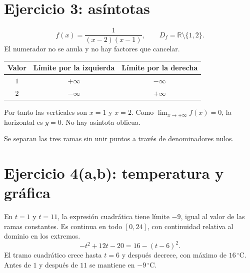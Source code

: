 \documentclass[11pt]{article}
\begin{document}
\section*{Ejercicio 3: asíntotas}
\[f(x)=\frac1{(x-2)(x-1)},\qquad D_f=\mathbb R\setminus\{1,2\}.\]
El numerador no se anula y no hay factores que cancelar.
\begin{center}\begin{tabular}{c|cc}
Valor & Límite por la izquierda & Límite por la derecha\\\hline
$1$ & $+\infty$ & $-\infty$\\
$2$ & $-\infty$ & $+\infty$
\end{tabular}\end{center}
Por tanto las verticales son $x=1$ y $x=2$. Como $\lim_{x\to\pm\infty}f(x)=0$, la horizontal es $y=0$. No hay asíntota oblicua.
\begin{center}\end{center}
Se separan las tres ramas sin unir puntos a través de denominadores nulos.
\clearpage
\section*{Ejercicio 4(a,b): temperatura y gráfica}
En $t=1$ y $t=11$, la expresión cuadrática tiene límite $-9$, igual al valor de las ramas constantes. Es continua en todo $[0,24]$, con continuidad relativa al dominio en los extremos.
\[-t^2+12t-20=16-(t-6)^2.\]
El tramo cuadrático crece hasta $t=6$ y después decrece, con máximo de $16\,^{\circ}\mathrm C$. Antes de $1$ y después de $11$ se mantiene en $-9\,^{\circ}\mathrm C$.
\begin{center}\end{center}
\end{document}
